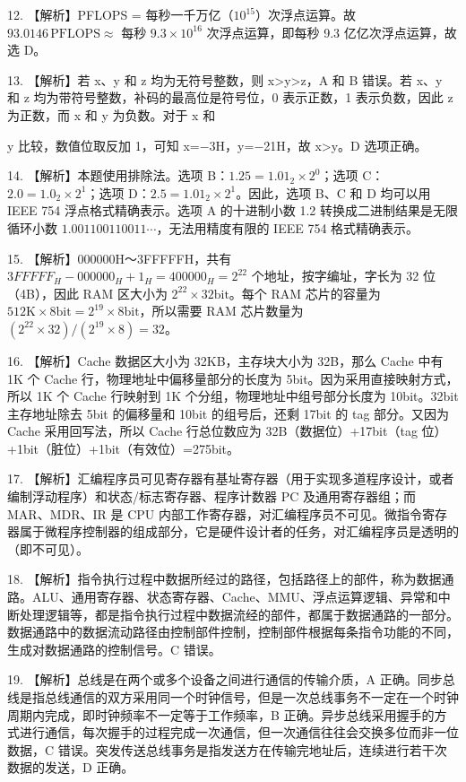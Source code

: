 \documentclass[UTF8,11pt]{ctexart}
\begin{document}
12. 【解析】PFLOPS = 每秒一千万亿（\(\displaystyle 10^{15}\)）次浮点运算。故 \(\displaystyle 93.0146\,\mathrm{PFLOPS}\approx\) 每秒 \(\displaystyle 9.3\times10^{16}\) 次浮点运算，即每秒 9.3 亿亿次浮点运算，故选 D。


13. 【解析】若 x、y 和 z 均为无符号整数，则 x>y>z，A 和 B 错误。若 x、y 和 z 均为带符号整数，补码的最高位是符号位，0 表示正数，1 表示负数，因此 z 为正数，而 x 和 y 为负数。对于 x 和


y 比较，数值位取反加 1，可知 x=\(\displaystyle -\)3H，y=\(\displaystyle -\)21H，故 x>y。D 选项正确。


14. 【解析】本题使用排除法。选项 B：\(\displaystyle 1.25=1.01_2\times2^0\)；选项 C：\(\displaystyle 2.0=1.0_2\times2^1\)；选项 D：\(\displaystyle 2.5=1.01_2\times2^1\)。因此，选项 B、C 和 D 均可以用 IEEE 754 浮点格式精确表示。选项 A 的十进制小数 1.2 转换成二进制结果是无限循环小数 \(\displaystyle 1.001100110011\cdots\)，无法用精度有限的 IEEE 754 格式精确表示。


15. 【解析】000000H～3FFFFFH，共有 \(\displaystyle 3FFFFF_H-000000_H+1_H=400000_H=2^{22}\) 个地址，按字编址，字长为 32 位（4B），因此 RAM 区大小为 \(\displaystyle 2^{22}\times32\mathrm{bit}\)。每个 RAM 芯片的容量为 \(\displaystyle 512\mathrm{K}\times8\mathrm{bit}=2^{19}\times8\mathrm{bit}\)，所以需要 RAM 芯片数量为 \(\displaystyle (2^{22}\times32)/(2^{19}\times8)=32\)。


16. 【解析】Cache 数据区大小为 32KB，主存块大小为 32B，那么 Cache 中有 1K 个 Cache 行，物理地址中偏移量部分的长度为 5bit。因为采用直接映射方式，所以 1K 个 Cache 行映射到 1K 个分组，物理地址中组号部分长度为 10bit。32bit 主存地址除去 5bit 的偏移量和 10bit 的组号后，还剩 17bit 的 tag 部分。又因为 Cache 采用回写法，所以 Cache 行总位数应为 32B（数据位）+17bit（tag 位）+1bit（脏位）+1bit（有效位）=275bit。


17. 【解析】汇编程序员可见寄存器有基址寄存器（用于实现多道程序设计，或者编制浮动程序）和状态/标志寄存器、程序计数器 PC 及通用寄存器组；而 MAR、MDR、IR 是 CPU 内部工作寄存器，对汇编程序员不可见。微指令寄存器属于微程序控制器的组成部分，它是硬件设计者的任务，对汇编程序员是透明的（即不可见）。


18. 【解析】指令执行过程中数据所经过的路径，包括路径上的部件，称为数据通路。ALU、通用寄存器、状态寄存器、Cache、MMU、浮点运算逻辑、异常和中断处理逻辑等，都是指令执行过程中数据流经的部件，都属于数据通路的一部分。数据通路中的数据流动路径由控制部件控制，控制部件根据每条指令功能的不同，生成对数据通路的控制信号。C 错误。


19. 【解析】总线是在两个或多个设备之间进行通信的传输介质，A 正确。同步总线是指总线通信的双方采用同一个时钟信号，但是一次总线事务不一定在一个时钟周期内完成，即时钟频率不一定等于工作频率，B 正确。异步总线采用握手的方式进行通信，每次握手的过程完成一次通信，但一次通信往往会交换多位而非一位数据，C 错误。突发传送总线事务是指发送方在传输完地址后，连续进行若干次数据的发送，D 正确。
\end{document}
